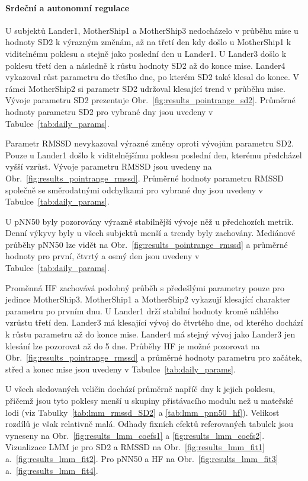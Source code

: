 \paragraph{Srdeční a autonomní regulace}
U subjektů Lander1, MotherShip1 a MotherShip3 nedocházelo v průběhu mise u
hodnoty SD2 k výrazným změnám, až na třetí den kdy došlo u MotherShip1 k
viditelnému poklesu a stejně jako poslední den u Lander1. U Lander3 došlo k
poklesu třetí den a následně k růstu hodnoty SD2 až do konce mise. Lander4
vykazoval růst parametru do třetího dne, po kterém SD2 také klesal do konce. V
rámci MotherShip2 si parametr SD2 udržoval klesající trend v průběhu mise.
Vývoje parametru SD2 prezentuje Obr.~\ref{fig:results_pointrange_sd2}. Průměrné
hodnoty parametru SD2 pro vybrané dny jsou uvedeny v
Tabulce~\ref{tab:daily_params}.

Parametr \gls{RMSSD} nevykazoval výrazné změny oproti vývojům parametru SD2.
Pouze u Lander1 došlo k viditelnějšímu poklesu poslední den, kterému předcházel
vyšší vzrůst. Vývoje parametru RMSSD jsou uvedeny na
Obr.~\ref{fig:results_pointrange_rmssd}. Průměrné hodnoty parametru RMSSD
společně se směrodatnými odchylkami pro vybrané dny jsou uvedeny v
Tabulce~\ref{tab:daily_params}.

U pNN50 byly pozorovány výrazně stabilnější vývoje něž u předchozích metrik.
Denní výkyvy byly u všech subjektů menší a trendy byly zachovány. Mediánové
průběhy pNN50 lze vidět na Obr.~\ref{fig:results_pointrange_rmssd} a průměrné
hodnoty pro první, čtvrtý a osmý den jsou uvedeny v
Tabulce~\ref{tab:daily_params}.

Proměnná HF zachovává podobný průběh s předešlými parametry pouze pro jedince
MotherShip3. MotherShip1 a MotherShip2 vykazují klesající charakter parametru po
prvním dnu. U Lander1 drží stabilní hodnoty kromě náhlého vzrůstu třetí den.
Lander3 má klesající vývoj do čtvrtého dne, od kterého dochází k růstu parametru
až do konce mise. Lander4 má stejný vývoj jako Lander3 jen klesání lze pozorovat
až do 5 dne. Průběhy HF je možné pozorovat na
Obr.~\ref{fig:results_pointrange_rmssd} a průměrné hodnoty parametru pro
začátek, střed a konec mise jsou uvedeny v Tabulce~\ref{tab:daily_params}.

U všech sledovaných veličin dochází průměrně napříč dny k jejich poklesu,
přičemž jsou tyto poklesy menší u skupiny přistávacího modulu než u mateřské
lodi (viz Tabulky~\ref{tab:lmm_rmssd_SD2} a \ref{tab:lmm_pnn50_hf}). Velikost
rozdílů je však relativně malá. Odhady fixních efektů referovaných tabulek jsou
vyneseny na Obr.~\ref{fig:results_lmm_coefs1} a \ref{fig:results_lmm_coefs2}.
Vizualizace \gls{LMM} je pro SD2 a RMSSD na Obr.~\ref{fig:results_lmm_fit1}
a.~\ref{fig:results_lmm_fit2}. Pro pNN50 a HF na Obr.~\ref{fig:results_lmm_fit3}
a.~\ref{fig:results_lmm_fit4}.

